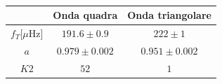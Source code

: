 \documentclass{article}
\begin{document}
        \begin{table}[H]
            \centering
            \begin{tabular}{ccc}
                \hline
                            &Onda quadra        & Onda triangolare\\
                \hline
                $f_T$[$\mu$Hz]  &$191.6\pm0.9$      & $222\pm1$\\
                $a$         &$0.979\pm0.002$    &   $0.951\pm0.002$\\
                $K2$        & $52   $             &   $1$ \\
            
                \hline
            \end{tabular}
            \caption{}
            \label{tab:results}
        \end{table}
        
        
\end{document}
